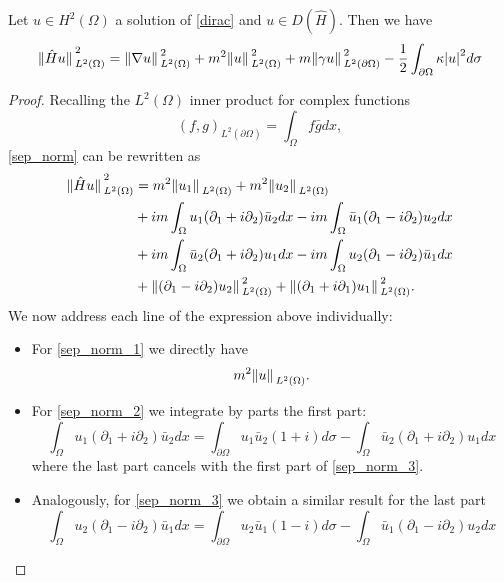 \begin{lemma}\label{lemma_sep_norm}
    Let \(u \in H^2(\Omega)\) a solution of \eqref{dirac} and \(u \in D(\hat{H})\). Then we have
    \begin{equation}\label{sep_norm}
        \norm*{\hat{H}u}_{L^2(\Omega)}^2 = \norm*{\nabla u }_{L^2(\Omega)}^2 + m^2 \norm*{u}_{L^2(\Omega)}^2 + m \norm*{\gamma u}_{L^2(\partial\Omega)}^2 -\frac{1}{2}\int_{\partial\Omega}\kappa \abs{u}^2 d\sigma
    \end{equation}
\end{lemma}
\begin{proof}
    Recalling the \(L^2(\Omega)\) inner product for complex functions
    \[
    (f, g)_{L^2(\partial\Omega)} = \int_\Omega f \bar{g} dx,
    \]
    \eqref{sep_norm} can be rewritten as 
    \begin{align}
        \norm*{\hat{H}u}_{L^2(\Omega)}^2 &= m^2 \norm*{u_1}_{L^2(\Omega)} + m^2 \norm*{u_2}_{L^2(\Omega)} \label{sep_norm_1}\\ 
        & + i m \int_\Omega u_1(\partial_1 + i \partial_2)\bar{u}_2dx - i m \int_\Omega \bar{u}_1(\partial_1 - i \partial_2)u_2 dx \label{sep_norm_2}\\ 
        & + i m \int_\Omega \bar{u}_2(\partial_1 + i \partial_2)u_1 dx - i m \int_\Omega u_2(\partial_1 - i \partial_2)\bar{u}_1 dx \label{sep_norm_3}\\ 
        & +\norm*{(\partial_1 - i \partial_2)u_2}_{L^2(\Omega)}^2 + \norm*{(\partial_1 + i \partial_1)u_1}_{L^2(\Omega)}^2. \label{sep_norm_4}
    \end{align}
    We now address each line of the expression above individually:
    \begin{itemize}
        \item For \eqref{sep_norm_1} we directly have
                \[
                m^2 \norm*{u}_{L^2(\Omega)}.
                \]
        \item For \eqref{sep_norm_2} we integrate by parts the first part:
                \[
                \int_\Omega u_1(\partial_1 + i \partial_2)\bar{u}_2dx = \int_{\partial\Omega} u_1\bar{u}_2(1+i)d\sigma - \int_\Omega \bar{u}_2(\partial_1 + i \partial_2)u_1dx
                \]
            where the last part cancels with the first part of \eqref{sep_norm_3}.
        \item Analogously, for \eqref{sep_norm_3} we obtain a similar result for the last part
                \[
                \int_\Omega u_2(\partial_1 - i \partial_2)\bar{u}_1dx = \int_{\partial\Omega} u_2\bar{u}_1(1-i)d\sigma - \int_\Omega \bar{u}_1(\partial_1 - i \partial_2)u_2dx 
\]
\end{itemize}
\end{proof}
